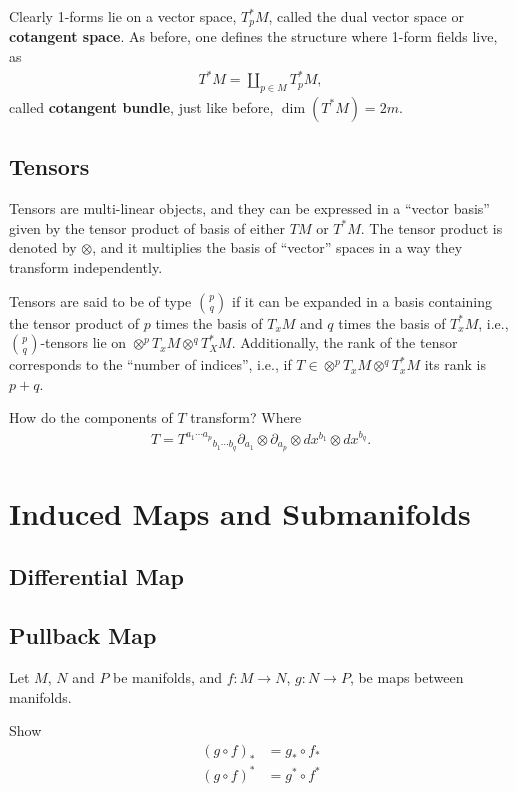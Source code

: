 Clearly 1-forms lie on a vector space, $T^*_p M$, called the dual vector space or {\bf cotangent space}. As before, one defines the structure where 1-form fields live, as 
\begin{align}
  T^*M = \coprod_{p\in M} T^*_p M,
\end{align}
called {\bf cotangent bundle}, just like before, $\dim(T^*M)=2m$.

\subsection{Tensors}

Tensors are multi-linear objects, and they can be expressed in a ``vector basis'' given by the tensor product of basis of either $TM$ or $T^*M$. The tensor product is denoted by $\otimes$, and  it multiplies the basis of ``vector'' spaces in a way they transform independently. 

Tensors are said to be of type $\binom{p}{q}$ if it can be expanded in a basis containing the tensor product of $p$ times the basis of $T_xM$ and $q$ times the basis of $T_x^*M$, i.e.,  $\binom{p}{q}$-tensors lie on $\otimes^p T_x M\otimes^q T_X^*M$. Additionally, the rank of the tensor corresponds to the ``number of indices'', i.e., if $T\in \otimes^p T_x M\otimes^q T_x^*M$ its rank is $p+q$.

\begin{Ebox}
  How do the components of $T$ transform? Where 
  \begin{align}
    T= T^{a_1\cdots a_p}{}_{b_1\cdots b_q} \partial_{a_1}\otimes\partial_{a_p}\otimes dx^{b_1}\otimes dx^{b_q}.
  \end{align}
\end{Ebox}



\section{Induced Maps and Submanifolds}

\subsection{Differential Map}

\subsection{Pullback Map}

\begin{Ebox}
  Let $M$, $N$ and $P$ be manifolds, and $ f:M\to N$, $g:N\to P$,  be maps between manifolds. 

  Show
  \begin{align*}
    (g\circ f)_* &= g_*\circ f_*\\
    (g\circ f)^* &= g^*\circ f^*
  \end{align*}
\end{Ebox}

